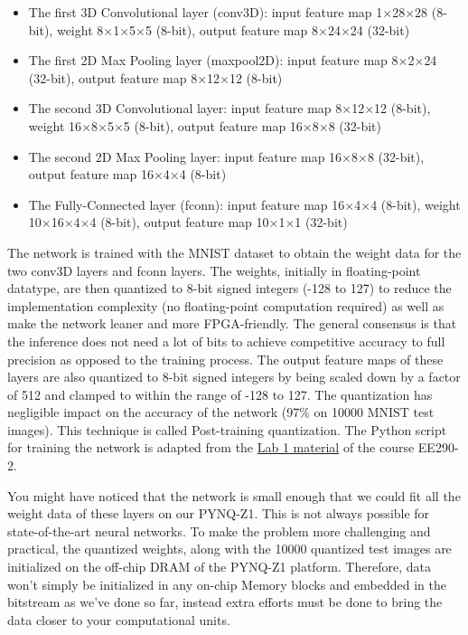\documentclass[11pt]{article}
\begin{document}
\begin{itemize}
\item The first 3D Convolutional layer (conv3D): input feature map 1$\times$28$\times$28 (8-bit), weight 8$\times$1$\times$5$\times$5 (8-bit), output feature map 8$\times$24$\times$24 (32-bit)
\item The first 2D Max Pooling layer (maxpool2D): input feature map 8$\times$2$\times$24 (32-bit), output feature map 8$\times$12$\times$12 (8-bit)
\item The second 3D Convolutional layer: input feature map 8$\times$12$\times$12 (8-bit), weight 16$\times$8$\times$5$\times$5 (8-bit), output feature map 16$\times$8$\times$8 (32-bit)
\item The second 2D Max Pooling layer: input feature map 16$\times$8$\times$8 (32-bit), output feature map 16$\times$4$\times$4 (8-bit)
\item The Fully-Connected layer (fconn): input feature map 16$\times$4$\times$4 (8-bit), weight 10$\times$16$\times$4$\times$4 (8-bit), output feature map 10$\times$1$\times$1 (32-bit)
\end{itemize}

The network is trained with the MNIST dataset to obtain the weight data for the two conv3D layers and fconn layers. The weights, initially in floating-point datatype, are then quantized to 8-bit signed integers (-128 to 127) to reduce the implementation complexity (no floating-point computation required) as well as make the network leaner and more FPGA-friendly. The general consensus is that the inference does not need a lot of bits to achieve competitive accuracy to full precision as opposed to the training process. The output feature maps of these layers are also quantized to 8-bit signed integers by being scaled down by a factor of 512 and clamped to within the range of -128 to 127. The quantization has negligible impact on the accuracy of the network (97\% on 10000 MNIST test images). This technique is called Post-training quantization. The Python script for training the network is adapted from the \href{https://drive.google.com/file/d/1LBtLjz2pdo6uj-E0aR69-ZGjmR9RBSDU/view}{Lab 1 material} of the course EE290-2.

You might have noticed that the network is small enough that we could fit all the weight data of these layers on our PYNQ-Z1. This is not always possible for state-of-the-art neural networks. To make the problem more challenging and practical, the quantized weights, along with the 10000 quantized test images are initialized on the off-chip DRAM of the PYNQ-Z1 platform. Therefore, data won't simply be initialized in any on-chip Memory blocks and embedded in the bitstream as we've done so far, instead extra efforts must be done to bring the data closer to your computational units.
\end{document}
